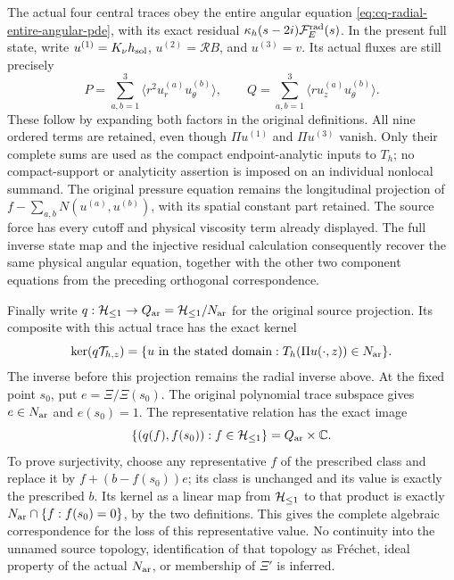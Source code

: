 The actual four central traces obey the entire angular equation
\eqref{eq:cq-radial-entire-angular-pde}, with its exact residual
\(\kappa_h(s-2i)\mathcal F_E^{\rm rad}(s)\).
In the present full state, write \(u^{(1)}=K_\nu h_{\rm sol}\),
\(u^{(2)}=\mathcal R B\), and \(u^{(3)}=v\). Its actual fluxes are
still precisely
\[
 P=\sum_{a,b=1}^3\langle r^2u_r^{(a)}u_\theta^{(b)}\rangle,
 \qquad
 Q=\sum_{a,b=1}^3\langle r u_z^{(a)}u_\theta^{(b)}\rangle.
\]
These follow by expanding both factors in the original definitions.
All nine ordered terms are retained, even though \(\Pi u^{(1)}\)
and \(\Pi u^{(3)}\) vanish. Only their complete sums are used as
the compact endpoint-analytic inputs to \(T_h\); no compact-support
or analyticity assertion is imposed on an individual nonlocal summand.
The original pressure equation remains the longitudinal projection of
\(f-\sum_{a,b}N(u^{(a)},u^{(b)})\), with its spatial constant part
retained. The source force has every cutoff and physical viscosity term
already displayed. The full inverse state map and the injective residual
calculation consequently recover the same physical angular equation,
together with the other two component equations from the preceding
orthogonal correspondence.

Finally write \(q:\mathcal H_{\leq 1}\to Q_{\rm ar}=\mathcal H_{\leq 1}/N_{\rm ar}\) for the original source
projection. Its composite with this actual trace has the exact kernel
\[
 \ker(q\mathcal T_{h,z})
 =\{u\text{ in the stated domain}:T_h(\Pi u(\cdot,z))\in N_{\rm ar}\}.
\]
The inverse before this projection remains the radial inverse above.
At the fixed point \(s_0\), put \(e=\Xi/\Xi(s_0)\). The original
polynomial trace subspace gives \(e\in N_{\rm ar}\) and \(e(s_0)=1\).
The representative relation has the exact image
\[
 \{(q(f),f(s_0)):f\in\mathcal H_{\leq 1}\}=Q_{\rm ar}\times\mathbb C.
\]
To prove surjectivity, choose any representative \(f\) of the prescribed
class and replace it by \(f+(b-f(s_0))e\); its class is unchanged and
its value is exactly the prescribed \(b\). Its kernel as a linear map
from \(\mathcal H_{\leq 1}\) to that product is exactly
\(N_{\rm ar}\cap\{f:f(s_0)=0\}\), by the two definitions.
This gives the complete algebraic correspondence for the loss of this
representative value. No continuity into the unnamed source topology,
identification of that topology as Fr\'echet, ideal property of the
actual \(N_{\rm ar}\), or membership of \(\Xi'\) is inferred.
